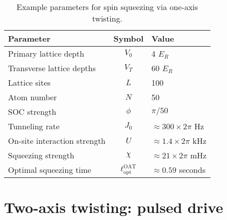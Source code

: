 \documentclass[aps,notitlepage,nofootinbib,11pt]{revtex4-1}
\renewcommand{\t}{\text} %
\newcommand{\1}{\hat{\mathds{1}}}
\begin{document}
\begin{table}[h]
  \centering
  \caption{Example parameters for spin squeezing via one-axis
    twisting.}
  \label{tab:parameters}
  \begin{tabular}{|l|c|l|}
    \hline
    Parameter & Symbol & Value \\ \hline\hline
    Primary lattice depth & $V_0$ & 4 $E_R$ \\
    Transverse lattice depths & $V_T$ & 60 $E_R$ \\
    Lattice sites & $L$ & 100 \\
    Atom number & $N$ & 50 \\
    SOC strength & $\phi$ & $\pi/50$ \\ \hline\hline
    Tunneling rate & $J_0$ & $\approx300\times2\pi$ Hz \\
    On-site interaction strength & $U$ & $\approx1.4\times2\pi$ kHz \\
    Squeezing strength & $\chi$ & $\approx21\times2\pi$ mHz \\
    Optimal squeezing time & $t_{\t{opt}}^{\t{OAT}}$
    & $\approx0.59$ seconds \\ \hline
  \end{tabular}
\end{table}


\section{Two-axis twisting: pulsed drive}
\end{document}
